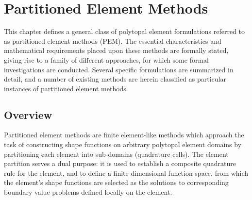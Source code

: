 \chapter{Partitioned Element Methods} \label{ch:pem}
%
This chapter defines a general class of polytopal element formulations referred to as partitioned element methods (PEM). The essential characteristics and mathematical requirements placed upon these methods are formally stated, giving rise to a family of different approaches, for which some formal investigations are conducted. Several specific formulations are summarized in detail, and a number of existing methods are herein classified as particular instances of partitioned element methods.

\section{Overview}


Partitioned element methods are finite element-like methods which approach the task of constructing shape functions on arbitrary polytopal element domains by partitioning each element into sub-domains (quadrature cells). The element partition serves a dual purpose: it is used to establish a composite quadrature rule for the element, and to define a finite dimensional function space, from which the element's shape functions are selected as the solutions to corresponding boundary value problems defined locally on the element.

